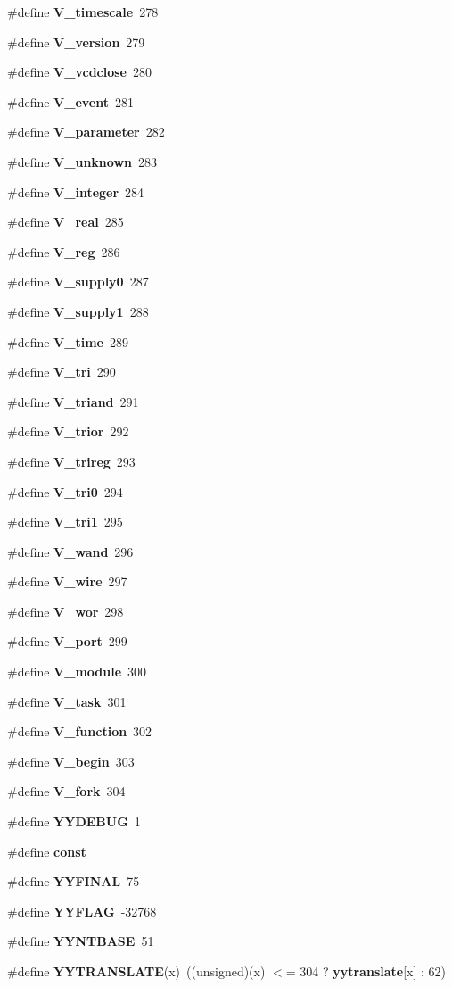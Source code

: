 \begin{CompactItemize}
\item 
\#define {\bf V\_\-timescale}\ 278
\item 
\#define {\bf V\_\-version}\ 279
\item 
\#define {\bf V\_\-vcdclose}\ 280
\item 
\#define {\bf V\_\-event}\ 281
\item 
\#define {\bf V\_\-parameter}\ 282
\item 
\#define {\bf V\_\-unknown}\ 283
\item 
\#define {\bf V\_\-integer}\ 284
\item 
\#define {\bf V\_\-real}\ 285
\item 
\#define {\bf V\_\-reg}\ 286
\item 
\#define {\bf V\_\-supply0}\ 287
\item 
\#define {\bf V\_\-supply1}\ 288
\item 
\#define {\bf V\_\-time}\ 289
\item 
\#define {\bf V\_\-tri}\ 290
\item 
\#define {\bf V\_\-triand}\ 291
\item 
\#define {\bf V\_\-trior}\ 292
\item 
\#define {\bf V\_\-trireg}\ 293
\item 
\#define {\bf V\_\-tri0}\ 294
\item 
\#define {\bf V\_\-tri1}\ 295
\item 
\#define {\bf V\_\-wand}\ 296
\item 
\#define {\bf V\_\-wire}\ 297
\item 
\#define {\bf V\_\-wor}\ 298
\item 
\#define {\bf V\_\-port}\ 299
\item 
\#define {\bf V\_\-module}\ 300
\item 
\#define {\bf V\_\-task}\ 301
\item 
\#define {\bf V\_\-function}\ 302
\item 
\#define {\bf V\_\-begin}\ 303
\item 
\#define {\bf V\_\-fork}\ 304
\item 
\#define {\bf YYDEBUG}\ 1
\item 
\#define {\bf const}
\item 
\#define {\bf YYFINAL}\ 75
\item 
\#define {\bf YYFLAG}\ -32768
\item 
\#define {\bf YYNTBASE}\ 51
\item 
\#define {\bf YYTRANSLATE}(x)\ ((unsigned)(x) $<$= 304 ? {\bf yytranslate}[x] : 62)

\end{CompactItemize}
